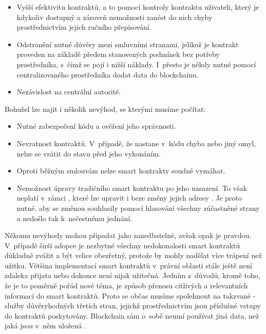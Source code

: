 \begin{itemize}
    \item Vyšší efektivitu kontraktů, a to pomocí kontroly kontraktu uživateli, který je kdykoliv dostupný a zároveň nemožnosti zanést do nich chyby prostřednictvím jejich ručního přepisování.
    \item Odstranění nutné důvěry mezi smluvními stranami, jelikož je kontrakt proveden na základě předem stanovených podmínek bez potřeby prostředníka, s~čímž se pojí i nižší náklady. I~přesto je někdy nutné pomocí centralizovaného prostředníka dodat data do blockchainu.
    \item Nezávislost na centrální autoritě.
\end{itemize}
Bohužel lze najít i několik nevýhod, se kterými musíme počítat:

\begin{itemize}
    \item Nutné zabezpečení kódu a ověření jeho správnosti. 
    \item Nevratnost kontraktů. V~případě, že nastane v~kódu chyba nebo jiný omyl, nelze se vrátit do stavu před jeho vykonáním.
    \item Oproti běžným smlouvám nelze smart kontrakty soudně vymáhat. 
    \item Nemožnost úpravy tradičního smart kontraktu po jeho nasazení. To však neplatí v~rámci , které lze upravit i beze změny jejich adresy \cite{upgradable}. Je proto nutné, aby se změnou souhlasily pomocí hlasování všechny zúčastněné strany a nedošlo tak k~nečestnému jednání.
\end{itemize}
Někomu nevýhody mohou připadat jako zanedbatelné, avšak opak je pravdou. V~případě širší adopce je nezbytné všechny nedokonalosti smart kontraktů důkladně zvážit a být velice obezřetný, protože by mohly nadělat více trápení než užitku. Většina implementací smart kontraktů v~právní oblasti stále ještě není zdaleka přijata nebo dokonce není nijak užitečná. Jedním z~důvodů, kromě toho, že je to poměrně pořád nové téma, je způsob přenosu citlivých a relevantních informací do smart kontraktů. Proto se občas musíme spolehnout na takzvané  - služby důvěryhodných třetích stran, jejichž prostřednictvím jsou příslušné vstupy do kontraktů poskytovány. Blockchain sám o~sobě neumí používat jiná data, než jaká jsou v~něm uložená \cite{fintech}.
